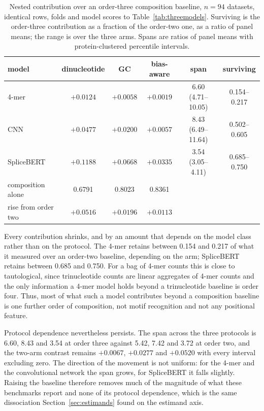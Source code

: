 \begin{table}[htbp]
\centering
\caption{Nested contribution over an order-three composition baseline, $n=94$ datasets,
identical rows, folds and model scores to Table~\ref{tab:threemodels}. Surviving is the
order-three contribution as a fraction of the order-two one, as a ratio of panel means;
the range is over the three arms.
Spans are ratios of panel means with protein-clustered percentile intervals.}
\label{tab:orderthree}
\begin{tabular}{lccccc}
\toprule
model & dinucleotide & GC & bias-aware & span & surviving \\
\midrule
4-mer & $+0.0124$ & $+0.0058$ & $+0.0019$ & 6.60 (4.71--10.05) & 0.154--0.217 \\
CNN & $+0.0477$ & $+0.0200$ & $+0.0057$ & 8.43 (6.49--11.64) & 0.502--0.605 \\
SpliceBERT & $+0.1188$ & $+0.0668$ & $+0.0335$ & 3.54 (3.05--4.11) & 0.685--0.750 \\
\midrule
composition alone & 0.6791 & 0.8023 & 0.8361 & & \\
rise from order two & $+0.0516$ & $+0.0196$ & $+0.0113$ & & \\
\bottomrule
\end{tabular}
\end{table}

Every contribution shrinks, and by an amount that depends on the model class rather than on the
protocol. The 4-mer retains between 0.154 and 0.217 of what it measured over an order-two baseline,
depending on the arm; SpliceBERT retains between 0.685 and 0.750. For a bag of 4-mer counts this is close to
tautological, since trinucleotide counts are linear aggregates of 4-mer counts and the only
information a 4-mer model holds beyond a trinucleotide baseline is order four. Thus, most of
what such a model contributes beyond a composition baseline is one
further order of composition, not motif recognition and not any positional feature.

Protocol dependence nevertheless persists. The span across the three protocols is 6.60,
8.43 and 3.54 at order three against 5.42, 7.42 and 3.72 at order two, and the two-arm contrast
remains $+0.0067$, $+0.0277$ and $+0.0520$ with every interval excluding zero. The direction of
the movement is not uniform: for the 4-mer and the convolutional network the span grows, for
SpliceBERT it falls slightly. Raising the baseline therefore removes much of the magnitude of
what these benchmarks report and none of its protocol dependence, which is the same
dissociation Section~\ref{sec:estimands} found on the estimand axis.

